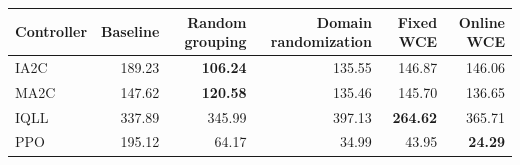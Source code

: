 \begin{tabular}{lrrrrr}
\hline
Controller & Baseline & Random grouping & Domain randomization & Fixed WCE & Online WCE \\
\hline
IA2C & 189.23 & \textbf{106.24} & 135.55 & 146.87 & 146.06 \\
MA2C & 147.62 & \textbf{120.58} & 135.46 & 145.70 & 136.65 \\
IQLL & 337.89 & 345.99 & 397.13 & \textbf{264.62} & 365.71 \\
PPO & 195.12 & 64.17 & 34.99 & 43.95 & \textbf{24.29} \\
\hline
\end{tabular}
